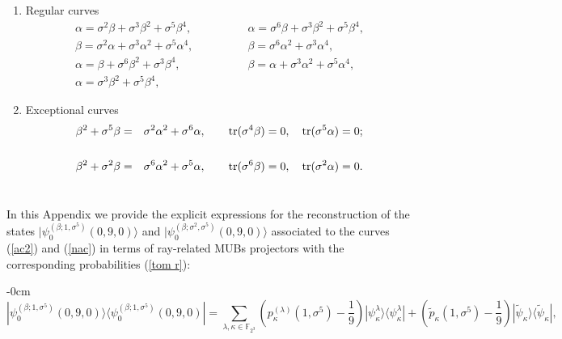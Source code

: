 \documentclass[quantumrep,article,submit,pdftex,moreauthors]{Definitions/mdpi}
\DeclareMathOperator{\tr}{tr}
\begin{document}
\begin{enumerate}[label = \alph*)]
  \item Regular curves 
    \begin{equation}
      \begin{array}{ll}
        \alpha = \sigma^{2}\beta + \sigma^{3}\beta^{2} + \sigma^{5}\beta^{4},
        \qquad\qquad
        & \alpha = \sigma^{6}\beta + \sigma^{3}\beta^{2} + \sigma^{5}\beta^{4},
        \\[5pt] 
        \beta = \sigma^{2}\alpha + \sigma^{3}\alpha^{2} + \sigma^{5}\alpha^{4},
        \qquad\qquad
        & \beta = \sigma^{6}\alpha^{2} + \sigma^{3}\alpha^{4}, \\[5pt] 
        \alpha = \beta + \sigma^{6}\beta^{2} + \sigma^{3}\beta^{4},
        \qquad\qquad
        & \beta = \alpha + \sigma^{3}\alpha^{2} + \sigma^{5}\alpha^{4}, \\[5pt] 
        \alpha = \sigma^{3}\beta^{2} + \sigma^{5}\beta^{4},
        \qquad\qquad
        & 
      \end{array}%
    \end{equation}

  \item Exceptional curves 
    \begin{eqnarray}
      \beta^{2}+\sigma^{5}\beta
      &=& \sigma^{2}\alpha^{2}+\sigma^{6}\alpha,
      \qquad \tr(\sigma^{4}\beta)=0,\quad \tr(\sigma^{5}\alpha) = 0;
      \notag \\
      && \\
      \beta^{2}+\sigma^{2}\beta
      &=& \sigma^{6}\alpha^{2} + \sigma^{5}\alpha,
      \qquad \tr(\sigma^{6}\beta) = 0,
      \quad \tr(\sigma^{2}\alpha) = 0.
      \notag
    \end{eqnarray}
\end{enumerate}

\section[\appendixname~\thesection]{}
\label{appC}

In this Appendix we provide the explicit expressions for the reconstruction of
the states $|\psi_{0}^{(\beta;1,\sigma^{5})}(0,9,0)\rangle$ and
$|\psi_{0}^{(\beta ;\sigma^{2},\sigma^{5})}(0,9,0)\rangle$ associated to the
curves (\ref{ac2}) and (\ref{nac}) in terms of ray-related MUBs projectors with
the corresponding probabilities (\ref{tom r}):

\begin{adjustwidth}{-\extralength}{0cm}
\begin{equation}
  |\psi _{0}^{(\beta ;1, \sigma^{5})}(0,9,0)\rangle
  \langle \psi_{0}^{(\beta;1,\sigma^{5})}(0,9,0)|
  = \sum_{\lambda ,\kappa \in \mathbb{F}_{2^{3}}}
  \left( p_{\kappa }^{(\lambda )}(1,\sigma ^{5})-\frac{1}{9}\right)
  |\psi_{\kappa}^{\lambda }\rangle \langle \psi_{\kappa }^{\lambda }|
  + \left( \tilde{p}_{\kappa }(1,\sigma ^{5})-\frac{1}{9}\right)
  |\tilde{\psi}_{\kappa }\rangle \langle \tilde{\psi}_{\kappa }|,
\end{equation}
\end{adjustwidth}
\end{document}
